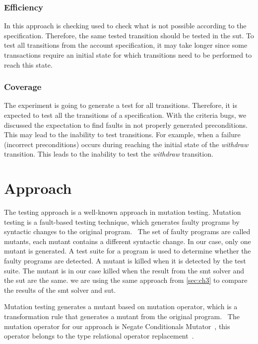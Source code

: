 \subsubsection{Efficiency}
In this approach is checking used to check what is not possible according to the
specification. Therefore, the same tested transition should be tested in the
\gls{sut}. To test all transitions from the account specification, it may take
longer since some transactions require an initial state for which transitions
need to be performed to reach this state.

\subsubsection{Coverage}
The experiment is going to generate a test for all transitions. Therefore,
it is expected to test all the transitions of a specification. With the criteria
bugs, we discussed the expectation to find faults in not properly generated
preconditions. This may lead to the inability to test transitions. For example,
when a failure (incorrect preconditions) occurs during reaching the initial
state of the \textit{withdraw} transition. This leads to the inability to test
the \textit{withdraw} transition.

\section{Approach}
The testing approach is a well-known approach in mutation testing. Mutation testing is
a fault-based testing technique, which generates faulty programs by syntactic
changes to the original program.~\cite[p.~1]{jia2011analysis} The set of faulty
programs are called mutants, each mutant contains a different syntactic change.
In our case, only one mutant is generated. A test suite for a program is used to
determine whether the faulty programs are detected. A mutant is killed when it
is detected by the test suite. The mutant is in our case killed when the result
from the \gls{smt} solver and the \gls{sut} are the same. we are using the same
approach from \autoref{sec:ch3} to compare the results of the \gls{smt} solver and
\gls{sut}.

Mutation testing generates a mutant based on
mutation operator, which is a transformation rule that generates a mutant from
the original program.~\cite[p.~3-4]{jia2011analysis} The mutation operator for
our approach is Negate Conditionals Mutator~\cite{pitmutators}, this operator
belongs to the type relational operator
replacement~\cite[p.~688]{king1991fortran}.

